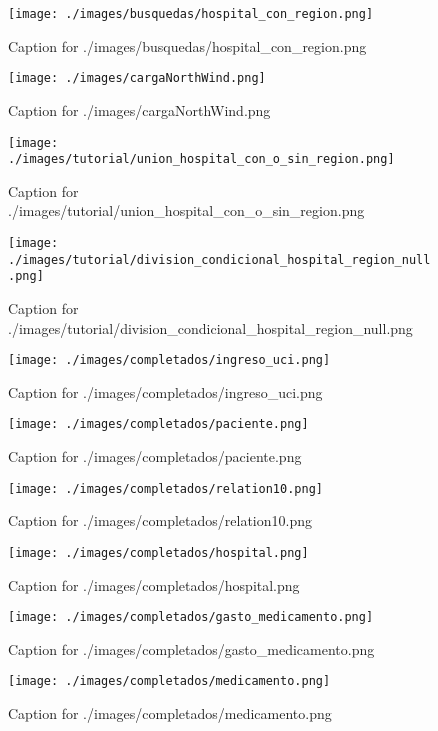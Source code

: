 \documentclass{article}
\begin{document}
\begin{figure}[H]
  \centering
  \texttt{[image: ./images/busquedas/hospital\_con\_region.png]}
  \caption{Caption for ./images/busquedas/hospital_con_region.png}
\end{figure}
\begin{figure}[H]
  \centering
  \texttt{[image: ./images/cargaNorthWind.png]}
  \caption{Caption for ./images/cargaNorthWind.png}
\end{figure}
\begin{figure}[H]
  \centering
  \texttt{[image: ./images/tutorial/union\_hospital\_con\_o\_sin\_region.png]}
  \caption{Caption for ./images/tutorial/union_hospital_con_o_sin_region.png}
\end{figure}
\begin{figure}[H]
  \centering
  \texttt{[image: ./images/tutorial/division\_condicional\_hospital\_region\_null.png]}
  \caption{Caption for ./images/tutorial/division_condicional_hospital_region_null.png}
\end{figure}
\begin{figure}[H]
  \centering
  \texttt{[image: ./images/completados/ingreso\_uci.png]}
  \caption{Caption for ./images/completados/ingreso_uci.png}
\end{figure}
\begin{figure}[H]
  \centering
  \texttt{[image: ./images/completados/paciente.png]}
  \caption{Caption for ./images/completados/paciente.png}
\end{figure}
\begin{figure}[H]
  \centering
  \texttt{[image: ./images/completados/relation10.png]}
  \caption{Caption for ./images/completados/relation10.png}
\end{figure}
\begin{figure}[H]
  \centering
  \texttt{[image: ./images/completados/hospital.png]}
  \caption{Caption for ./images/completados/hospital.png}
\end{figure}
\begin{figure}[H]
  \centering
  \texttt{[image: ./images/completados/gasto\_medicamento.png]}
  \caption{Caption for ./images/completados/gasto_medicamento.png}
\end{figure}
\begin{figure}[H]
  \centering
  \texttt{[image: ./images/completados/medicamento.png]}
  \caption{Caption for ./images/completados/medicamento.png}
\end{figure}
\end{document}
